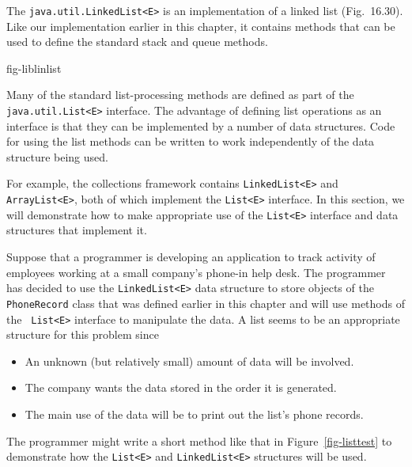 The {\tt java.util.LinkedList<E>} is an implementation of a linked
list (Fig.~16.30).  Like our implementation earlier in this
chapter, it contains methods that can be used to define the standard
stack and queue methods.

{fig-liblinlist}

Many of the standard list-processing methods are defined as part of
the {\tt java.util.List<E>} interface.  The advantage of defining list
operations as an interface is that they can be implemented by a number
of data structures.  Code for using the list methods can be written to
work independently of the data structure being used.  

For example, the collections framework contains {\tt LinkedList<E>}
and {\tt ArrayList<E>}, both of which implement the {\tt List<E>}
interface.  In this section, we will demonstrate how to make
appropriate use of the {\tt List<E>} interface and data structures
that implement it.

Suppose that a programmer is developing an application to track
activity of employees working at a small company's phone-in help desk.
The programmer has decided to use the {\tt LinkedList<E>} data
structure to store objects of the {\tt PhoneRecord} class that was
defined earlier in this chapter and will use methods of the {\tt
List<E>} interface to manipulate the data.  A list seems to be an
appropriate structure for this problem since
\begin{itemize}
\item  {An unknown (but relatively small) amount of data will be involved.}
\item  {The company wants the data stored in the order it is generated.}
\item  {The main use of the data will be to print out the list's 
phone records.}
\end{itemize}

\noindent The programmer might write a short method like that in
Figure~\ref{fig-listtest} to demonstrate how the {\tt List<E>} and
{\tt LinkedList<E>} structures will be used.

